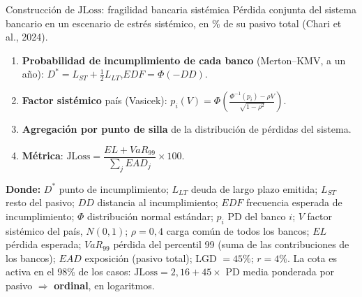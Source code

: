 \documentclass[aspectratio=169]{beamer}
\newcommand{\JLoss}{\mathrm{JLoss}}
\begin{document}
\begin{frame}{Construcción de $\JLoss$: fragilidad bancaria sistémica}
\small
Pérdida conjunta del sistema bancario en un escenario de estrés sistémico, en \% de su pasivo total (Chari et al., 2024).
\begin{enumerate}
\item \textbf{Probabilidad de incumplimiento de cada banco} (Merton--KMV, a un año): $D^*=L_{ST}+\tfrac12L_{LT}$,\quad $EDF=\Phi(-DD)$.
\item \textbf{Factor sistémico} país (Vasicek): $p_i(V)=\Phi\!\left(\frac{\Phi^{-1}(p_i)-\rho V}{\sqrt{1-\rho^2}}\right)$.
\item \textbf{Agregación por punto de silla} de la distribución de pérdidas del sistema.
\item \textbf{Métrica}: $\JLoss=\dfrac{EL+VaR_{99}}{\sum_j EAD_j}\times100$.
\end{enumerate}
\vspace{2pt}
{\scriptsize \textbf{Donde:} $D^*$ punto de incumplimiento; $L_{LT}$ deuda de largo plazo emitida; $L_{ST}$ resto del pasivo; $DD$ distancia al incumplimiento; $EDF$ frecuencia esperada de incumplimiento; $\Phi$ distribución normal estándar; $p_i$ PD del banco $i$; $V$ factor sistémico del país, $N(0,1)$; $\rho=0{,}4$ carga común de todos los bancos; $EL$ pérdida esperada; $VaR_{99}$ pérdida del percentil 99 (suma de las contribuciones de los bancos); $EAD$ exposición (pasivo total); LGD $=45\%$; $r=4\%$. La cota es activa en el 98\% de los casos: $\JLoss=2{,}16+45\times$ PD media ponderada por pasivo $\Rightarrow$ \textbf{ordinal}, en logaritmos.\par}
\end{frame}
\end{document}
